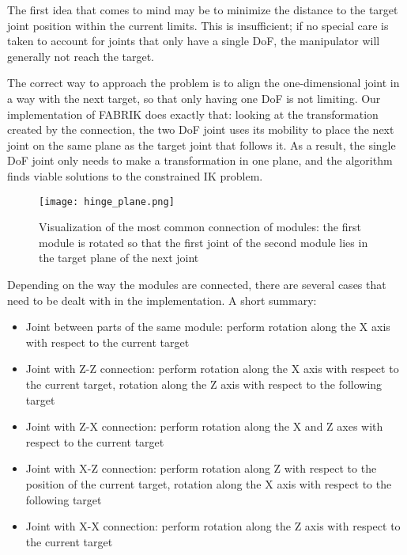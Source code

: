 The first idea that comes to mind may be to minimize the distance to the target joint position within the current limits. This is insufficient; if no special care is taken to account for joints that only have a single DoF, the manipulator will generally not reach the target.

The correct way to approach the problem is to align the one-dimensional joint in a way with the next target, so that only having one DoF is not limiting. Our implementation of FABRIK does exactly that: looking at the transformation created by the connection, the two DoF joint uses its mobility to place the next joint on the same plane as the target joint that follows it. As a result, the single DoF joint only needs to make a transformation in one plane, and the algorithm finds viable solutions to the constrained IK problem.

\begin{figure}[h]
    \centering
    \begin{minipage}{.6\textwidth}
        \texttt{[image: hinge\_plane.png]}
    \end{minipage}
    \caption{Visualization of the most common connection of modules: the first module is rotated so that the first joint of the second module lies in the target plane of the next joint~\cite{Ondika2021thesis}}\label{fig:hinge}
\end{figure}

Depending on the way the modules are connected, there are several cases that need to be dealt with in the implementation. A short summary:

\begin{itemize}
  \item Joint between parts of the same module: perform rotation along the X axis with respect to the current target
  \item Joint with Z-Z connection: perform rotation along the X axis with respect to the current target, rotation along the Z axis with respect to the following target
  \item Joint with Z-X connection: perform rotation along the X and Z axes with respect to the current target
  \item Joint with X-Z connection: perform rotation along Z with respect to the position of the current target, rotation along the X axis with respect to the following target
  \item Joint with X-X connection: perform rotation along the Z axis with respect to the current target
  \end{itemize}

